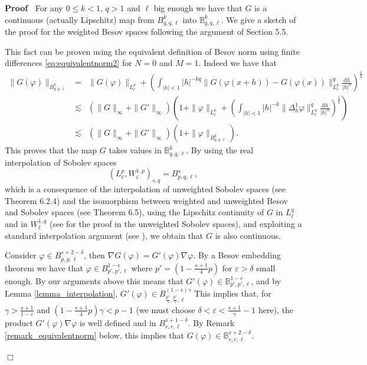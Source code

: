 \documentclass[a4paper,10pt]{article}
\newcommand{\mathd}{\mathrm{d}}
\newenvironment{proof}{\noindent\textbf{Proof\ }}{\hspace*{\fill}$\Box$\medskip}
\begin{document}
\begin{proof}
  For any $0 \leq k < 1$, $q > 1$ and $\ell$ big enough we have that $G$ is a
  continuous (actually Lipschitz) map from $B^k_{q, q, \ell}$ into
  $\mathbb{B}^k_{q, q, \ell}$. We give a sketch of the proof for the weighted
  Besov spaces following the argument of {\cite{Runst1996}} Section 5.5.
  
  This fact can be proven using the equivalent definition of Besov norm using
  finite differences {\eqref{eq:equivalentnorm2}} for $N = 0$ and $M = 1$.
  Indeed we have that
  \begin{eqnarray}
    \| G (\varphi) \|_{B^k_{q, q, \ell}} & = & \| G (\varphi) \|_{L^p_{\ell}}
    + \left( \int_{| h | < 1} | h |^{- k q} \| G (\varphi (x + h)) - G
    (\varphi (x)) \|_{L^q_{\ell}}^q \frac{\mathd h}{| h |^n}
    \right)^{\frac{1}{q}} \nonumber\\
    & \lesssim & (\| G \|_{\infty} + \| G' \|_{\infty}) \left( 1 + \| \varphi
    \|_{L^p_{\ell}} + \left( \int_{| h | < 1} | h |^{- k} \| \Delta^1_h
    \varphi \|_{L^q_{\ell}}^q \frac{\mathd h}{| h |^n} \right)^{\frac{1}{q}}
    \right) \nonumber\\
    & \lesssim & (\| G \|_{\infty} + \| G' \|_{\infty}) (1 + \| \varphi
    \|_{B^k_{q, q, \ell}}) . \nonumber
  \end{eqnarray}
  This proves that the map $G$ takes values in $\mathbb{B}^k_{q, q, \ell}$. By
  using the real interpolation of Sobolev spaces
  \[ (L^p_{\ell}, W^{1, p}_{\ell})_{s, q} = B^s_{p, q, \ell}, \]
  which is a consequence of the interpolation of unweighted Sobolev spaces
  (see {\cite{Joran1976}} Theorem 6.2.4) and the isomorphism between weighted
  and unweighted Besov and Sobolev spaces (see {\cite{Triebel2006}} Theorem
  6.5), using the Lipschitz continuity of $G$ in $L^q_{\ell}$ and in $W^{1,
  q}_{\ell}$ (see {\cite{Bourdaud2011}} for the proof in the unweighted
  Sobolev spaces), and exploiting a standard interpolation argument (see
  {\cite{Maligranda}}), we obtain that $G$ is also continuous.
  
  Consider $\varphi \in B^{s + 2 - \delta}_{p, p, \ell}$, then $\nabla G
  (\varphi) = G' (\varphi) \nabla \varphi$. By a Besov embedding theorem we
  have that $\varphi \in B^{1 - \epsilon}_{p', p', \ell}$ where $p' = \left( 1
  - \frac{s + 1}{4} p \right)$ for $\varepsilon > \delta$ small enough. By our
  arguments above this means that $G' (\varphi) \in \mathbb{B}^{1 -
  \epsilon}_{p', p', \ell}$, and by Lemma \ref{lemma_interpolation}, $G'
  (\varphi) \in B^{(1 - \epsilon) \gamma}_{\frac{p'}{\gamma},
  \frac{p'}{\gamma}, \ell}$ This implies that, for $\gamma > \frac{s + 1}{1 -
  \varepsilon}$ and $\left( 1 - \frac{s + 1}{4} p \right) \gamma < p - 1$ (we
  must choose $\delta < \varepsilon < \frac{s + 1}{\gamma} - 1$ here), the
  product $G' (\varphi) \nabla \varphi$ is well defined and in $B^{s + 1 -
  \delta}_{r, r, \ell}$. By Remark \ref{remark_equivalentnorm} below, this
  implies that $G (\varphi) \in \mathbb{B}^{s + 2 - \delta}_{r, r, \ell}$.
  

\end{proof}
\end{document}
